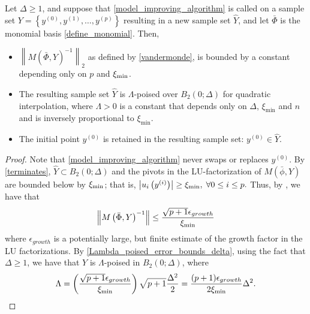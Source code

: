 \begin{theorem}
\label{set_is_poised}

Let $\Delta \ge 1$, and suppose that \cref{model_improving_algorithm} is called on a sample set $Y = \left\{y^{(0)}, y^{(1)}, \ldots, y^{(p)}\right\}$ 
resulting in a new sample set $\hat Y$,
and let $\bar{\Phi}$ is the monomial basis \cref{define_monomial}.
Then,
\begin{itemize}
\item $\left\|M(\bar \Phi, \hat Y)^{-1}\right\|_2$ as defined by \cref{vandermonde}, is bounded by a constant depending only on $p$ and $\xi_{\text{min}}$.
\item The resulting sample set $\hat Y$ is $\Lambda$-poised over $B_2\left(0;\Delta\right)$ for quadratic interpolation,
where $\Lambda > 0$ is a constant that depends only on $\Delta$, $\xi_{\text{min}}$ and $n$ and is inversely proportional to $\xi_{\text{min}}$.
\item The initial point $y^{(0)}$ is retained in the resulting sample set: $y^{(0)} \in \hat Y$.
\end{itemize}
\end{theorem}

\begin{proof}

Note that \cref{model_improving_algorithm} never swaps or replaces $y^{(0)}$.
By \cref{terminates},  $\hat Y \subset B_2(0;\Delta)$
and the pivots in the LU-factorization of $M(\bar{\phi},Y)$ are bounded below by $\xi_{\text{min}}$; that is,
$\left|u_i\left(y^{(i)}\right)\right| \ge \xi_{\text{min}}, \; \forall 0 \le i \le p.$
Thus, by 
\cite[Section 6.7, Exercise 3]{introduction_book}, 
 we have that 
\begin{align*}
\left\|M\left(\bar \Phi, Y\right)^{-1}\right\| \le \frac{\sqrt{p+1}\epsilon_{growth}}{\xi_{\text{min}}}
\end{align*}
where $\epsilon_{growth}$ is a potentially large, but finite estimate of the growth factor in the LU factorizations.   By  \cref{Lambda_poised_error_bounds_delta},  using the fact that $\Delta \ge 1$, we have that $Y$ is $\Lambda$-poised in $B_2(0;\Delta)$,  where 
\[\Lambda = \left(\frac{\sqrt{p+1}\epsilon_{growth}}{\xi_{\text{min}}}\right) \sqrt{p+1}  \frac{\Delta^2}{2} = \frac{(p+1) \epsilon_{growth}}{2\xi_{\text{min}}}\Delta^2.\]
%
%
%
%
\end{proof}

